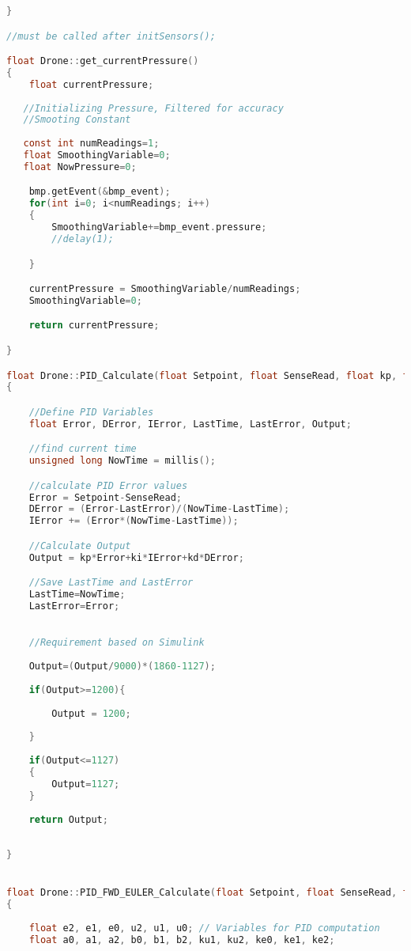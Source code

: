 \begin{lstlisting}[language=C,caption={Drone.cpp Arduino Library File},label={lst:Drone.cpp}]
}

//must be called after initSensors();

float Drone::get_currentPressure()
{
    float currentPressure;
    
   //Initializing Pressure, Filtered for accuracy
   //Smooting Constant
    
   const int numReadings=1;
   float SmoothingVariable=0;
   float NowPressure=0;

    bmp.getEvent(&bmp_event);
    for(int i=0; i<numReadings; i++)
    {
        SmoothingVariable+=bmp_event.pressure;
        //delay(1);

    }

    currentPressure = SmoothingVariable/numReadings;
    SmoothingVariable=0;

    return currentPressure;

}

float Drone::PID_Calculate(float Setpoint, float SenseRead, float kp, float kd, float ki)
{

    //Define PID Variables
    float Error, DError, IError, LastTime, LastError, Output;

    //find current time
    unsigned long NowTime = millis();

    //calculate PID Error values
    Error = Setpoint-SenseRead;
    DError = (Error-LastError)/(NowTime-LastTime);
    IError += (Error*(NowTime-LastTime));

    //Calculate Output
    Output = kp*Error+ki*IError+kd*DError;

    //Save LastTime and LastError
    LastTime=NowTime;
    LastError=Error;

    
    //Requirement based on Simulink
    
    Output=(Output/9000)*(1860-1127);
    
    if(Output>=1200){
        
        Output = 1200; 
        
    }
    
    if(Output<=1127)
    {
        Output=1127;
    }
    
    return Output;
    
    
}


float Drone::PID_FWD_EULER_Calculate(float Setpoint, float SenseRead, float kp, float kd, float ki, float Ts, float N)
{
    
    float e2, e1, e0, u2, u1, u0; // Variables for PID computation
    float a0, a1, a2, b0, b1, b2, ku1, ku2, ke0, ke1, ke2;
    

\end{lstlisting}
